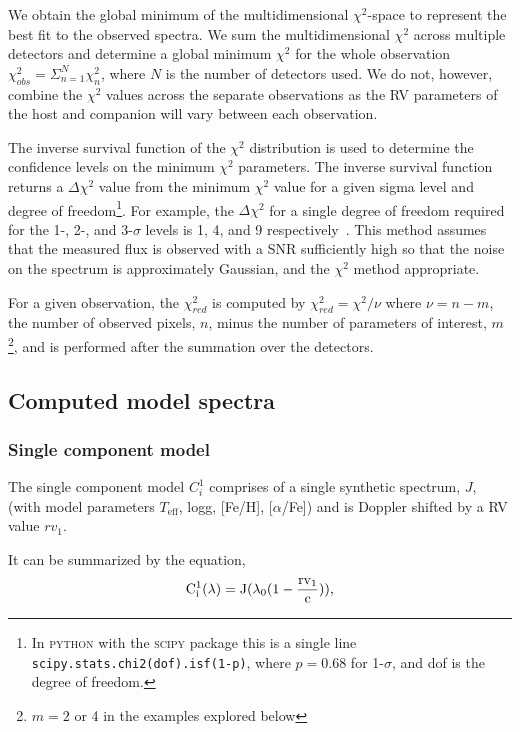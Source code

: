 \documentclass[fleqn,usenatbib]{mnras}
\begin{document}
We obtain the global minimum of the multidimensional \(\chi^{2}\)-space to represent the best fit to the observed spectra. We sum the multidimensional \(\chi^{2}\) across multiple detectors and determine a global minimum \(\chi^{2}\) for the whole observation \(\chi^{2}_{obs} = \Sigma^{N}_{n=1} \chi^{2}_n\), where \(N\) is the number of detectors used. We do not, however, combine the \(\chi^{2}\) values across the separate observations as the RV parameters of the host and companion will vary between each observation.

The inverse survival function of the \(\chi^2\) distribution is used to determine the confidence levels on the minimum \(\chi^2\) parameters. The inverse survival function returns a \(\Delta\chi^2\) value from the minimum \(\chi^2\) value for a given sigma level and degree of freedom\footnote{In \textsc{python} with the \textsc{scipy} package this is a single line \texttt{scipy.stats.chi2(dof).isf(1-p)}, where \(p = 0.68\) for 1-\(\sigma\), and dof is the degree of freedom.}.
For example, the \(\Delta \chi^2\) for a single degree of freedom required for the 1-, 2-, and 3-\(\sigma\) levels is 1, 4, and 9 respectively~\citep{bevington_data_2003}. This method assumes that the measured flux is observed with a SNR sufficiently high so that the noise on the spectrum is approximately Gaussian, and the \(\chi^2\) method appropriate.

For a given observation, the \(\chi^{2}_{red}\) is computed by \(\chi^2_{red} = \chi^2 / \nu\) where \(\nu = n - m\), the number of observed pixels, \(n\), minus the number of parameters of interest, \(m\)\footnote{\(m=2\) or 4 in the examples explored below}, and is performed after the summation over the detectors.

\subsection{Computed model spectra}
\label{models}
\subsubsection{Single component model}
\label{subsubsec:single-model}
The single component model \(C^{1}_{i}\) comprises of a single synthetic spectrum, \(J\), (with model parameters \(T_{\textrm{eff}}\), logg, [Fe/H], [\(\alpha\)/Fe]) and is Doppler shifted by a RV value \({rv}_1\).

It can be summarized by the equation, 
\begin{equation}
\rm C^{1}_{i}(\lambda) = J(\lambda_0(1-\frac{{rv}_1}{c})),
\end{equation}
\end{document}
